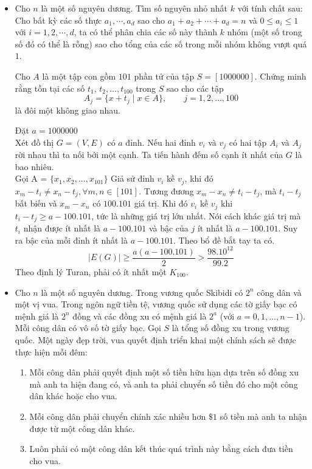 \documentclass[11pt]{scrartcl}
\begin{document}
\begin{itemize}[label=, leftmargin=0em, itemsep=0.5em]
    \item \begin{btvn}
        Cho $n$ là một số nguyên dương. Tìm số nguyên nhỏ nhất $k$ với tính chất sau: Cho bất kỳ các số thực $a_1 , \cdots , a_d $ sao cho $a_1 + a_2 + \cdots + a_d = n$ và $0 \le a_i \le 1$ với $i=1,2,\cdots ,d$, ta có thể phân chia các số này thành $k$ nhóm (một số trong số đó có thể là rỗng) sao cho tổng của các số trong mỗi nhóm không vượt quá $1$.
    \end{btvn}

    \begin{bt}
        Cho $A$ là một tập con gồm $101$ phần tử của tập $S=[1000000]$. Chứng minh rằng tồn tại các số $t_1$, $t_2, \ldots, t_{100}$ trong $S$ sao cho các tập\[ A_j=\{x+t_j\mid x\in A\},\qquad j=1,2,\ldots,100  \]là đôi một không giao nhau.
    \end{bt}
    \begin{sol}
        Đặt $a = 1000000$\\
        Xét đồ thị $G=(V,E)$ có $a$ đỉnh. Nếu hai đỉnh $v_i$ và $v_j$ có hai tập $A_i$ và $A_j$ rời nhau thì ta nối bởi một cạnh. Ta tiến hành đếm số cạnh ít nhất của $G$ là bao nhiêu.\\
        Gọi A = $\{x_1,x_2,...,x_{101}\}$
        Giả sử đỉnh $v_i$ kề $v_j$, khi đó $ x_m - t_i \neq x_n - t_j, \forall m,n \in [101]$. Tương đương $x_m - x_n \neq t_i - t_j$, mà $t_i -t_j$ bất biến và $x_m - x_n$ có $100.101$ giá trị. Khi đó $v_i$ kề $v_j$ khi $t_i - t_j \geq a - 100.101$, tức là những giá trị lớn nhất. Nói cách khác giá trị mà $t_i$ nhận được ít nhất là $a - 100.101$ và bậc của $j$ ít nhất là $a - 100.101$. Suy ra bậc của mỗi đỉnh ít nhất là $a - 100.101$. Theo bổ đề bắt tay ta có.
        $$
            |E(G)| \geq \frac{a(a - 100.101)}{2} > \frac{98.10^{12}}{99.2}
        $$
        Theo định lý Turan, phải có ít nhất một $K_{100}$.   
    \end{sol}
    
    \item\begin{bt}
        Cho $n$ là một số nguyên dương. Trong vương quốc Skibidi có $2^n$ công dân và một vị vua. Trong ngôn ngữ tiền tệ, vương quốc sử dụng các tờ giấy bạc có mệnh giá là $2^n$ đồng và các đồng xu có mệnh giá là $2^a$ (với $a=0,1,\ldots,n-1$). Mỗi công dân có vô số tờ giấy bạc. Gọi $S$ là tổng số đồng xu trong vương quốc. Một ngày đẹp trời, vua quyết định triển khai một chính sách sẽ được thực hiện mỗi đêm:
        \begin{enumerate}
            \item Mỗi công dân phải quyết định một số tiền hữu hạn dựa trên số đồng xu mà anh ta hiện đang có, và anh ta phải chuyển số tiền đó cho một công dân khác hoặc cho vua.
            \item Mỗi công dân phải chuyển chính xác nhiều hơn $\$1$ số tiền mà anh ta nhận được từ một công dân khác. 
            \item Luôn phải có một công dân kết thúc quá trình này bằng cách đưa tiền cho vua.
        \end{enumerate}


\end{bt}
\end{itemize}
\end{document}
